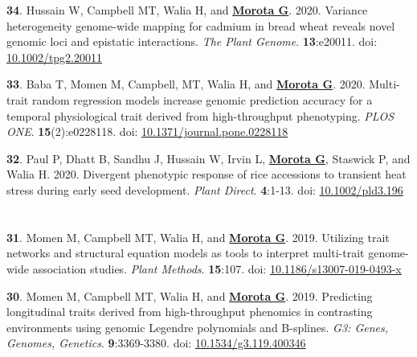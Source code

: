 \documentclass[margin,line,10pt]{res}
\newenvironment{list1}{
  \begin{list}{\ding{113}}{%
      \setlength{\itemsep}{0in}
      \setlength{\parsep}{0in} \setlength{\parskip}{0in}
      \setlength{\topsep}{0in} \setlength{\partopsep}{0in} 
      \setlength{\leftmargin}{0.17in}}}{\end{list}}
\begin{document}
\begin{resume}
\begin{list1}
      \vspace{0.5cm}

  \item  [{\bf 34}.]  Hussain W, Campbell MT, Walia H, and \textbf{\underline{Morota G}}. 2020. Variance heterogeneity genome-wide mapping for cadmium in bread wheat reveals novel genomic loci and epistatic interactions. \emph{The Plant Genome}. \textbf{13}:e20011. doi: \textcolor{blue}{\href{https://doi.org/10.1002/tpg2.20011}{10.1002/tpg2.20011}}

    \vspace{0.5cm}
    
  \item  [{\bf 33}.] Baba T, Momen M, Campbell, MT, Walia H, and \textbf{\underline{Morota G}}. 2020. Multi-trait random regression models increase genomic prediction accuracy for a temporal physiological trait derived from high-throughput phenotyping. \emph{PLOS ONE}. \textbf{15}(2):e0228118. doi: \textcolor{blue}{\href{https://doi.org/10.1371/journal.pone.0228118}{10.1371/journal.pone.0228118}}
  
  \vspace{0.5cm}

\item [{\bf 32}.] Paul P, Dhatt B, Sandhu J, Hussain W, Irvin L, \textbf{\underline{Morota G}}, Staswick P, and Walia H. 2020. Divergent phenotypic response of rice accessions to transient heat stress during early seed development. \emph{Plant Direct}. \textbf{4}:1-13. doi: \textcolor{blue}{\href{https://doi.org/10.1002/pld3.196}{10.1002/pld3.196}}

  \end{list1}


\section{}
\begin{list1}
  
\item  [{\bf 31}.] Momen M, Campbell MT, Walia H, and \textbf{\underline{Morota G}}. 2019. Utilizing trait networks and structural equation models as tools to interpret multi-trait genome-wide association studies. \emph{Plant Methods}. \textbf{15}:107. doi: \textcolor{blue}{\href{https://doi.org/10.1186/s13007-019-0493-x}{10.1186/s13007-019-0493-x}}

     \vspace{0.5cm}
     
\item  [{\bf 30}.]  Momen M, Campbell MT, Walia H, and \textbf{\underline{Morota G}}. 2019. Predicting longitudinal traits derived from high-throughput phenomics in contrasting environments using genomic Legendre polynomials and B-splines. \emph{G3: Genes, Genomes, Genetics}. \textbf{9}:3369-3380.  doi: \textcolor{blue}{\href{https://doi.org/10.1534/g3.119.400346}{10.1534/g3.119.400346}}


\end{list1}
\end{resume}
\end{document}
